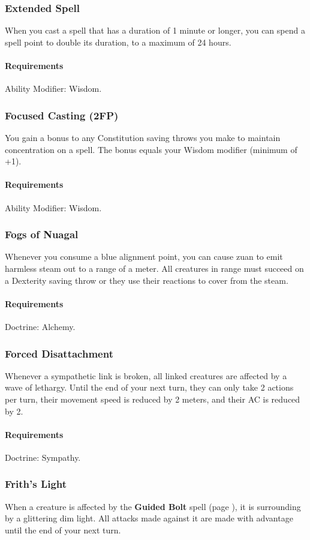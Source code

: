 \subsubsection{Extended Spell} \label{feat::extendedspell}
    When you cast a spell that has a duration of 1 minute or longer, you can spend a spell point to double its duration, to a maximum of 24 hours.
    \paragraph{Requirements} Ability Modifier: Wisdom.
\subsubsection{Focused Casting (2FP)} \label{feat::focusedcasting}
    You gain a bonus to any Constitution saving throws you make to maintain concentration on a spell.
    The bonus equals your Wisdom modifier (minimum of +1).
    \paragraph{Requirements} Ability Modifier: Wisdom.
\subsubsection{Fogs of Nuagal} \label{feat::fogsofnuagal}
    Whenever you consume a blue alignment point, you can cause zuan to emit harmless steam out to a range of a meter.
    All creatures in range must succeed on a Dexterity saving throw or they use their reactions to cover from the steam.
    \paragraph{Requirements} Doctrine: Alchemy.
\subsubsection{Forced Disattachment} \label{feat::forceddisattachment}
    Whenever a sympathetic link is broken, all linked creatures are affected by a wave of lethargy.
    Until the end of your next turn, they can only take 2 actions per turn, their movement speed is reduced by 2 meters, and their AC is reduced by 2.
    \paragraph{Requirements} Doctrine: Sympathy.
\subsubsection{Frith's Light} \label{feat::frithslight}
    When a creature is affected by the \textbf{Guided Bolt} spell (page \pageref{spell::guidedbolt}), it is surrounding by a glittering dim light.
    All attacks made against it are made with advantage until the end of your next turn.

